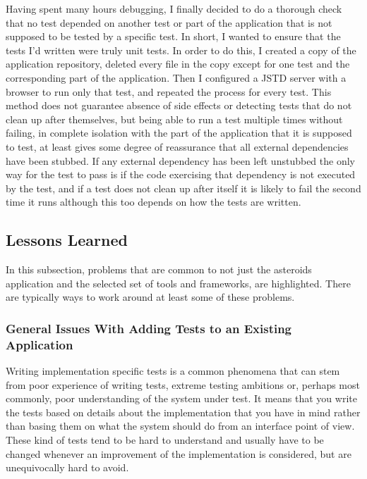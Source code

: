 \documentclass[11pt]{article}
\begin{document}
Having spent many hours debugging, I finally decided to do a thorough check that no test depended on another test or part of the application that is not supposed to be tested by a specific test. In short, I wanted to ensure that the tests I'd written were truly unit tests. In order to do this, I created a copy of the application repository, deleted every file in the copy except for one test and the corresponding part of the application. Then I configured a JSTD server with a browser to run only that test, and repeated the process for every test. This method does not guarantee absence of side effects or detecting tests that do not clean up after themselves, but being able to run a test multiple times without failing, in complete isolation with the part of the application that it is supposed to test, at least gives some degree of reassurance that all external dependencies have been stubbed. If any external dependency has been left unstubbed the only way for the test to pass is if the code exercising that dependency is not executed by the test, and if a test does not clean up after itself it is likely to fail the second time it runs although this too depends on how the tests are written.

\subsection{Lessons Learned}

In this subsection, problems that are common to not just the asteroids application and the selected set of tools and frameworks, are highlighted. There are typically ways to work around at least some of these problems.

\subsubsection{General Issues With Adding Tests to an Existing Application}

Writing implementation specific tests is a common phenomena that can stem from poor experience of writing tests, extreme testing ambitions or, perhaps most commonly, poor understanding of the system under test. It means that you write the tests based on details about the implementation that you have in mind rather than basing them on what the system should do from an interface point of view. These kind of tests tend to be hard to understand and usually have to be changed whenever an improvement of the implementation is considered, but are unequivocally hard to avoid.
\end{document}
